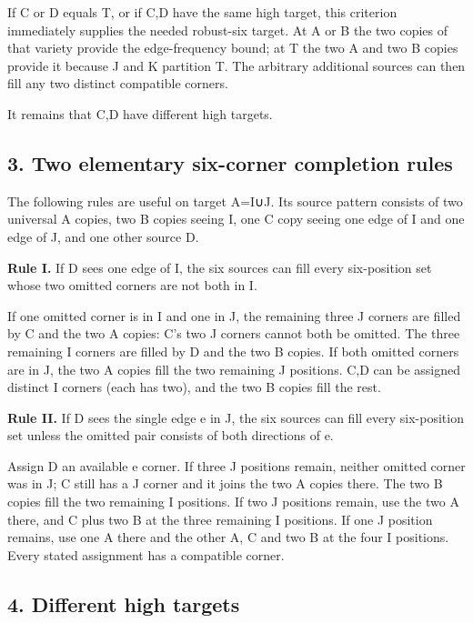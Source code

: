 \documentclass[
  10pt,
]{article}
\begin{document}
If C or D equals T, or if C,D have the same high target, this criterion
immediately supplies the needed robust-six target. At A or B the two
copies of that variety provide the edge-frequency bound; at T the two A
and two B copies provide it because J and K partition T. The arbitrary
additional sources can then fill any two distinct compatible corners.

It remains that C,D have different high targets.

\hypertarget{two-elementary-six-corner-completion-rules}{%
\subsection*{3. Two elementary six-corner completion
rules}\label{two-elementary-six-corner-completion-rules}}

The following rules are useful on target A=I∪J. Its source pattern
consists of two universal A copies, two B copies seeing I, one C copy
seeing one edge of I and one edge of J, and one other source D.

\textbf{Rule I.} If D sees one edge of I, the six sources can fill every
six-position set whose two omitted corners are not both in I.

If one omitted corner is in I and one in J, the remaining three J
corners are filled by C and the two A copies: C's two J corners cannot
both be omitted. The three remaining I corners are filled by D and the
two B copies. If both omitted corners are in J, the two A copies fill
the two remaining J positions. C,D can be assigned distinct I corners
(each has two), and the two B copies fill the rest.

\textbf{Rule II.} If D sees the single edge e in J, the six sources can
fill every six-position set unless the omitted pair consists of both
directions of e.

Assign D an available e corner. If three J positions remain, neither
omitted corner was in J; C still has a J corner and it joins the two A
copies there. The two B copies fill the two remaining I positions. If
two J positions remain, use the two A there, and C plus two B at the
three remaining I positions. If one J position remains, use one A there
and the other A, C and two B at the four I positions. Every stated
assignment has a compatible corner.

\hypertarget{different-high-targets}{%
\subsection*{4. Different high targets}\label{different-high-targets}}
\end{document}
